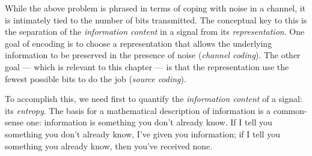 While the above problem is phrased in terms of coping with noise in a
channel, it is intimately tied to the number of bits transmitted. The
conceptual key to this is the separation of the \emph{information
content} in a signal from its \emph{representation}.  One goal of
encoding is to choose a representation that allows the underlying
information to be preserved in the presence of noise (\emph{channel
coding}). The other goal --- which is relevant to this chapter --- is
that the representation use the fewest possible bits to do the job
(\emph{source coding}).

To accomplish this, we need first to quantify the \emph{information
content} of a signal: its \emph{entropy}. The basis for a mathematical
description of information is a common-sense one: information is
something you don't already know. If I tell you something you don't
already know, I've given you information; if I tell you something you
already know, then you've received none.


\end{window}
